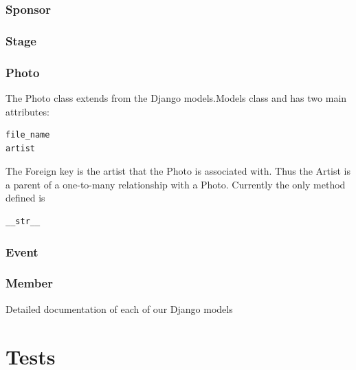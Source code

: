 \documentclass[12pt,english]{article}
\begin{document}
\subsubsection{Sponsor}

\subsubsection{Stage}

\subsubsection{Photo}
The Photo class extends from the Django models.Models class and has two main attributes: 
\begin{verbatim}
file_name
artist
 \end{verbatim}

The Foreign key is the artist that the Photo is associated with. Thus the Artist is a parent
of a one-to-many relationship with a Photo. Currently the only method defined is 
\begin{verbatim}
__str__ 
\end{verbatim} 

\subsubsection{Event}

\subsubsection{Member}

Detailed documentation of each of our Django models
\section{Tests}
\end{document}
